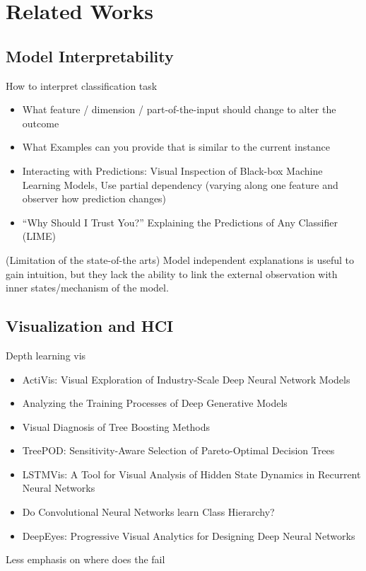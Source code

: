 \section{Related Works}

\subsection{Model Interpretability}

How to interpret classification task
\begin{itemize}
    \item What feature / dimension / part-of-the-input should change to
    alter the outcome
    \item What Examples can you provide that is similar to the current
    instance
\end{itemize}
\begin{itemize}
    \item Interacting with Predictions: Visual Inspection of Black-box Machine Learning Models,
    Use partial dependency (varying along one feature and observer how prediction changes)
    \item “Why Should I Trust You?” Explaining the Predictions of Any Classifier (LIME)
\end{itemize}

(Limitation of the state-of-the arts)
Model independent explanations is useful to gain intuition, but they lack the ability to link the external observation with inner states/mechanism of the model.

\subsection{Visualization and HCI}
Depth learning vis
\begin{itemize}
    \item ActiVis: Visual Exploration of Industry-Scale Deep Neural Network Models
    \item Analyzing the Training Processes of Deep Generative Models
    \item Visual Diagnosis of Tree Boosting Methods
    \item TreePOD: Sensitivity-Aware Selection of Pareto-Optimal Decision Trees
    \item LSTMVis: A Tool for Visual Analysis of Hidden State Dynamics in Recurrent Neural Networks
    \item Do Convolutional Neural Networks learn Class Hierarchy?
    \item DeepEyes: Progressive Visual Analytics for Designing Deep Neural Networks
\end{itemize}

Less emphasis on where does the fail
